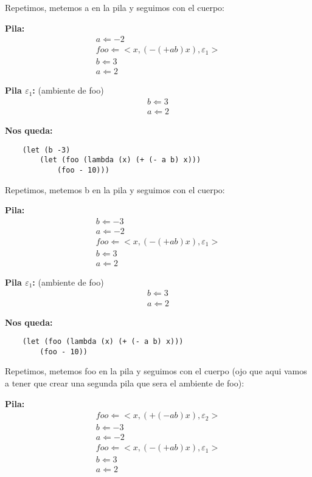 Repetimos, metemos a en la pila y seguimos con el cuerpo: \vspace{.3cm}

\textbf{Pila:}
\[
\begin{array}{c}
    a \Leftarrow -2 \\
    foo \Leftarrow <x,(- (+ a b) x),\varepsilon_1> \\
    b \Leftarrow 3 \\
    a \Leftarrow 2
\end{array}
\]

\textbf{Pila $\varepsilon_1$:} (ambiente de foo)
\[
\begin{array}{c}
    b \Leftarrow 3 \\
    a \Leftarrow 2
\end{array}
\]

\textbf{Nos queda:}
\begin{verbatim}
    (let (b -3)
        (let (foo (lambda (x) (+ (- a b) x)))
            (foo - 10)))
\end{verbatim}

Repetimos, metemos b en la pila y seguimos con el cuerpo: \vspace{.3cm}

\textbf{Pila:}
\[
\begin{array}{c}
    b \Leftarrow -3 \\
    a \Leftarrow -2 \\
    foo \Leftarrow <x,(- (+ a b) x),\varepsilon_1> \\
    b \Leftarrow 3 \\
    a \Leftarrow 2
\end{array}
\]

\textbf{Pila $\varepsilon_1$:} (ambiente de foo)
\[
\begin{array}{c}
    b \Leftarrow 3 \\
    a \Leftarrow 2
\end{array}
\]

\textbf{Nos queda:}
\begin{verbatim}
    (let (foo (lambda (x) (+ (- a b) x)))
        (foo - 10))
\end{verbatim}

Repetimos, metemos foo en la pila y seguimos con el cuerpo (ojo que aqui
vamos a tener que crear una segunda pila que sera el ambiente de foo): \vspace{.3cm}

\textbf{Pila:}
\[
\begin{array}{c}
    foo \Leftarrow <x,(+ (- a b) x),\varepsilon_2> \\
    b \Leftarrow -3 \\
    a \Leftarrow -2 \\
    foo \Leftarrow <x,(- (+ a b) x),\varepsilon_1> \\
    b \Leftarrow 3 \\
    a \Leftarrow 2
\end{array}
\]

